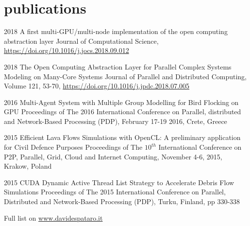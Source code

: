 \documentclass[]{twentysecondscv}
\begin{document}
\section{publications}
\begin{twenty}
    \twentyitem
    {2018}
    {A first multi-GPU/multi-node implementation of the open computing abstraction layer}
    {}
    {\footnotesize{Journal of Computational Science, \url{https://doi.org/10.1016/j.jocs.2018.09.012}}}

    \twentyitem
    {2018}
    {The Open Computing Abstraction Layer for Parallel Complex Systems Modeling on Many-Core Systems}
    {}
    {\footnotesize{Journal of Parallel and Distributed Computing, Volume 121, 53-70, \url{https://doi.org/10.1016/j.jpdc.2018.07.005}}} 
    
    \twentyitem
    {2016}
    {Multi-Agent System with Multiple Group Modelling for Bird Flocking on GPU}
    {}
    {\footnotesize{Proceedings of The 2016 International Conference on Parallel, distributed and Network-Based Processing (PDP), February 17-19 2016, Crete, Greece}}
    
    
    \twentyitem
    {2015}
    {Efficient Lava Flows Simulations with OpenCL: A preliminary application for Civil Defence Purposes}
    {}
    {\footnotesize{Proceedings of The $10^{th}$ International Conference on P2P, Parallel, Grid, Cloud and Internet Computing, November 4-6, 2015, Krakow, Poland}}
     
    \twentyitem 
    {2015}
    {CUDA Dynamic Active Thread List Strategy to Accelerate Debris Flow Simulations}
    {}
    {\footnotesize{Proceedings of The 2015 International Conference on Parallel, Distributed and Network-Based Processing (PDP), Turku, Finland, pp 330-338}}

\end{twenty}
Full list on \url{www.davidespataro.it}


\end{document}
